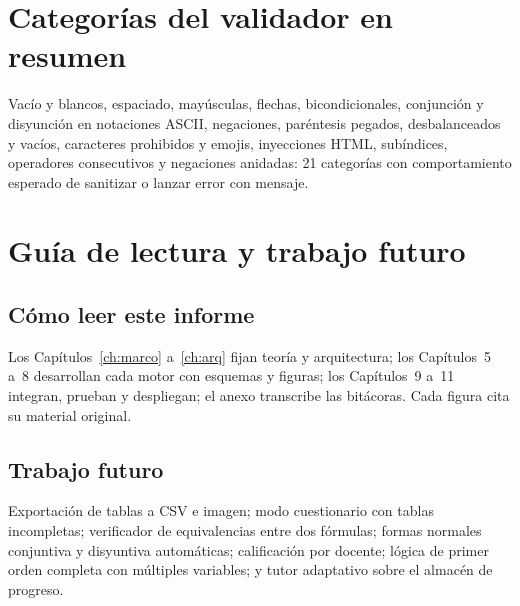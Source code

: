 \documentclass[11pt,a4paper,openany]{book}
\begin{document}
\chapter{Categor\'ias del validador en resumen}
\label{ch:val-res}
Vac\'io y blancos, espaciado, may\'usculas, flechas, bicondicionales, conjunci\'on y disyunci\'on en notaciones ASCII, negaciones, par\'entesis pegados, desbalanceados y vac\'ios, caracteres prohibidos y emojis, inyecciones HTML, sub\'indices, operadores consecutivos y negaciones anidadas: 21 categor\'ias con comportamiento esperado de sanitizar o lanzar error con mensaje.


\chapter{Gu\'ia de lectura y trabajo futuro}
\label{ch:guia-futuro}
\section{C\'omo leer este informe}
Los Cap\'itulos~\ref{ch:marco} a~\ref{ch:arq} fijan teor\'ia y arquitectura; los Cap\'itulos~5 a~8 desarrollan cada motor con esquemas y figuras; los Cap\'itulos~9 a~11 integran, prueban y despliegan; el anexo transcribe las bit\'acoras. Cada figura cita su material original.
\section{Trabajo futuro}
Exportaci\'on de tablas a CSV e imagen; modo cuestionario con tablas incompletas; verificador de equivalencias entre dos f\'ormulas; formas normales conjuntiva y disyuntiva autom\'aticas; calificaci\'on por docente; l\'ogica de primer orden completa con m\'ultiples variables; y tutor adaptativo sobre el almac\'en de progreso.
\end{document}
